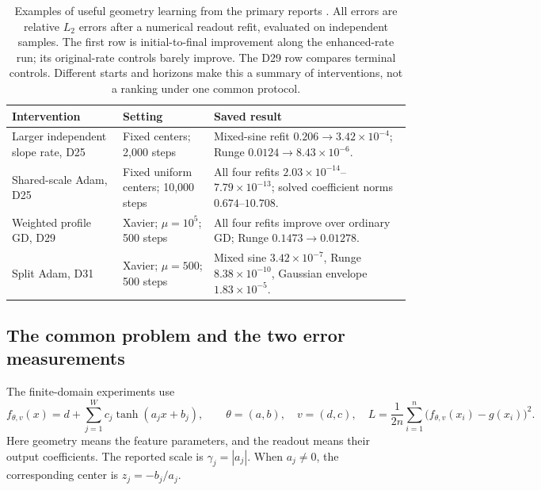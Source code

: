 \documentclass[11pt]{article}
\begin{document}
\begin{table}[htbp]
\centering
\small
\begin{tabularx}{\textwidth}{@{}>{\raggedright\arraybackslash}p{}>{\raggedright\arraybackslash}p{}>{\raggedright\arraybackslash}X@{}}
\toprule
Intervention & Setting & Saved result \\
\midrule
Larger independent slope rate, D25 & Fixed centers; 2,000 steps &
Mixed-sine refit $0.206\to3.42\times10^{-4}$; Runge $0.0124\to8.43\times10^{-6}$. \\
\addlinespace
Shared-scale Adam, D25 & Fixed uniform centers; 10,000 steps &
All four refits $2.03\times10^{-14}$--$7.79\times10^{-13}$; solved coefficient norms $0.674$--$10.708$. \\
\addlinespace
Weighted profile GD, D29 & Xavier; $\mu=10^5$; 500 steps &
All four refits improve over ordinary GD; Runge $0.1473\to0.01278$. \\
\addlinespace
Split Adam, D31 & Xavier; $\mu=500$; 500 steps &
Mixed sine $3.42\times10^{-7}$, Runge $8.38\times10^{-10}$, Gaussian envelope $1.83\times10^{-5}$. \\
\bottomrule
\end{tabularx}
\caption{Examples of useful geometry learning from the primary reports \cite{D25,D29,D31}. All errors are relative $L_2$ errors after a numerical readout refit, evaluated on independent samples. The first row is initial-to-final improvement along the enhanced-rate run; its original-rate controls barely improve. The D29 row compares terminal controls. Different starts and horizons make this a summary of interventions, not a ranking under one common protocol.}
\label{tab:overview}
\end{table}

\subsection{The common problem and the two error measurements}

The finite-domain experiments use
\begin{equation}
 f_{\theta,v}(x)=d+\sum_{j=1}^{W}c_j\tanh(a_jx+b_j),
 \qquad \theta=(a,b),\quad v=(d,c),\quad
 L=\frac1{2n}\sum_{i=1}^{n}\bigl(f_{\theta,v}(x_i)-g(x_i)\bigr)^2.
 \label{eq:model}
\end{equation}
Here geometry means the feature parameters, and the readout means their output coefficients. The reported scale is $\gamma_j=|a_j|$. When $a_j\ne0$, the corresponding center is $z_j=-b_j/a_j$.
\end{document}
